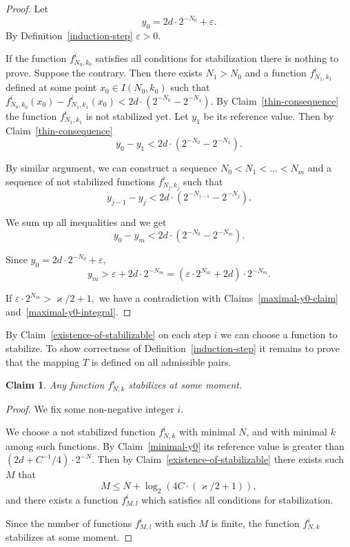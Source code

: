 \documentclass[12pt]{article}
\newtheorem{clai}[prop]{Claim}
\theoremstyle{definition}
\begin{document}
\begin{proof}
Let
$$
y_0 = 2d\cdot2^{-N_0} + \varepsilon.
$$ 
By Definition~\ref{induction-step} $\varepsilon>0.$

If the function $f_{N_0,k_0}^i$ satisfies all conditions for stabilization there is nothing to prove. Suppose the contrary. Then there exists $N_1>N_0$ and a function $f_{N_1,k_1}^i$ defined at some point $x_0\in I(N_0, k_0)$ such that $f_{N_0,k_0}^i(x_0) - f_{N_1,k_1}^i(x_0) < 2d\cdot\left(2^{-N_0} - 2^{-N_1}\right).$ By Claim~\ref{thin-consequence} the function $f_{N_1,k_1}^i$ is not stabilized yet. Let $y_1$ be its reference value. Then by Claim~\ref{thin-consequence}
$$
y_0-y_1 < 2d\cdot\left(2^{-N_0} - 2^{-N_1}\right).
$$

By similar argument, we can construct a sequence $N_0 < N_1 < \dots < N_m$ and a sequence of not stabilized functions $f_{N_j,k_j}^i$ such that
$$
y_{j-1} - y_j < 2d \cdot\left(2^{-N_{j-1}} - 2^{-N_j}\right).
$$

We sum up all inequalities and we get
$$
y_0 - y_m < 2d\cdot\left(2^{-N_{0}} - 2^{-N_m}\right).
$$

Since $y_0 = 2d\cdot2^{-N_0} + \varepsilon,$ 
$$
y_m > \varepsilon + 2d\cdot 2^{-N_m} = \left(\varepsilon\cdot 2^{N_m} + 2d\right)\cdot2^{-N_m}.
$$

If $\varepsilon\cdot2^{N_m} > \varkappa/2 + 1,$ we have a contradiction with Claims~\ref{maximal-y0-claim} and~\ref{maximal-y0-integral}.
\end{proof}

By Claim~\ref{existence-of-stabilizable} on each step $i$ we can choose a function to stabilize. To show correctness of Definition~\ref{induction-step} it remains to prove that the mapping $T$ is defined on all admissible pairs.

\begin{clai}
\label{T-is-bijection}
Any function $f_{N,k}^i$ stabilizes at some moment.
\end{clai}

\begin{proof}
We fix some non-negative integer $i$.

We choose a not stabilized function $f_{N,k}^i$ with minimal $N$, and with minimal $k$ among such functions. By Claim~\ref{minimal-y0} its reference value is greater than $\left(2d + C^{-1}/4\right)\cdot 2^{-N}.$ Then by Claim~\ref{existence-of-stabilizable} there exists such $M$ that
$$
M \le N + \log_2\left(4C\cdot(\varkappa/2 + 1)\right),
$$
and there exists a function $f_{M,l}^i$ which satisfies all conditions for stabilization.

Since the number of functions $f_{M,l}^i$ with such $M$ is finite, the function $f_{N,k}^i$ stabilizes at some moment.
\end{proof}
\end{document}
